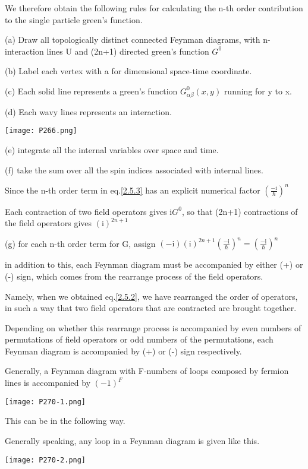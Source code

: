 We therefore obtain the following rules for calculating the n-th order contribution to the single particle green's function.

(a) Draw all topologically distinct connected Feynman diagrams, with n-interaction lines U and (2n+1) directed green's function $G^0$

(b) Label each vertex with a for dimensional space-time coordinate.

(c) Each solid line represents a green's function $G_{\alpha\beta}^0(x,y)$ running for y to x.

(d) Each wavy lines represents an interaction.
\begin{center}
\texttt{[image: P266.png]}
\end{center}
(e) integrate all the internal variables over space and time.

(f) take the sum over all the spin indices associated with internal lines.

Since the n-th order term in eq.\eqref{2.5.3} has an explicit numerical factor $(\frac{-\mathrm{i}}{\hbar})^n$

Each contraction of two field operators gives $\mathrm{i}G^0$, so that (2n+1) contractions of the field operators gives $(\mathrm{i})^{2n+1}$

(g) for each n-th order term for G, assign $(-\mathrm{i})(\mathrm{i})^{2n+1}(\frac{-\mathrm{i}}{\hbar})^n=(\frac{-\mathrm{i}}{\hbar})^n$

in addition to this, each Feynman diagram must be accompanied by  either (+) or (-) sign, which comes from the rearrange process of the field operators.

Namely, when we obtained eq.\eqref{2.5.2}, we have rearranged the order of operators, in such a way that two field operators that are contracted are brought together.

Depending on whether this rearrange process is accompanied by even numbers of permutations of field operators or odd numbers of the permutations, each Feynman diagram is accompanied by (+) or (-) sign respectively.

Generally, a Feynman diagram with F-numbers of loops composed by fermion lines is accompanied by $(-1)^F$
\begin{center}
\texttt{[image: P270-1.png]}
\end{center}
This can be in the following way.

Generally speaking, any loop in a Feynman diagram is given like this.
\begin{center}
\texttt{[image: P270-2.png]}
\end{center}

